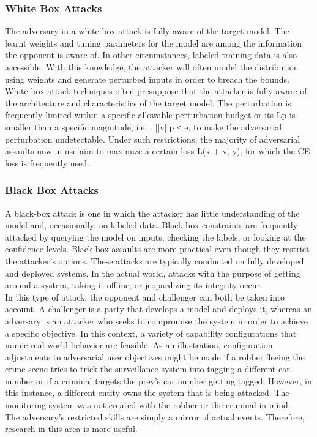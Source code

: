 \documentclass[ 12pt,a4paper,twocolumn,fleqn]{article}
\begin{document}
\subsubsection{White Box Attacks}
The adversary in a white-box attack is fully aware of the target model. The learnt weights and tuning parameters for the model are among the information the opponent is aware of. In other circumstances, labeled training data is also accessible. With this knowledge, the attacker will often model the distribution using weights and generate perturbed inputs in order to breach the bounds.\\
%
White-box attack techniques often presuppose that the attacker is fully aware of the architecture and characteristics of the target model. The perturbation is frequently limited within a specific allowable perturbation budget or its Lp is smaller than a specific magnitude, i.e. . ||v||p ≤ e, to make the adversarial perturbation undetectable. Under such restrictions, the majority of adversarial assaults now in use aim to maximize a certain loss L(x + v, y), for which the CE loss is frequently used.\\
\subsubsection{Black Box Attacks}
A black-box attack is one in which the attacker has little understanding of the model and, occasionally, no labeled data. Black-box constraints are frequently attacked by querying the model on inputs, checking the labels, or looking at the confidence levels. Black-box assaults are more practical even though they restrict the attacker's options. These attacks are typically conducted on fully developed and deployed systems. In the actual world, attacks with the purpose of getting around a system, taking it offline, or jeopardizing its integrity occur.\\
%
In this type of attack, the opponent and challenger can both be taken into account. A challenger is a party that develops a model and deploys it, whereas an adversary is an attacker who seeks to compromise the system in order to achieve a specific objective. In this context, a variety of capability configurations that mimic real-world behavior are feasible. As an illustration, configuration adjustments to adversarial user objectives might be made if a robber fleeing the crime scene tries to trick the surveillance system into tagging a different car number or if a criminal targets the prey's car number getting tagged. However, in this instance, a different entity owns the system that is being attacked. The monitoring system was not created with the robber or the criminal in mind.\\
%
The adversary's restricted skills are simply a mirror of actual events. Therefore, research in this area is more useful.\\
\end{document}
